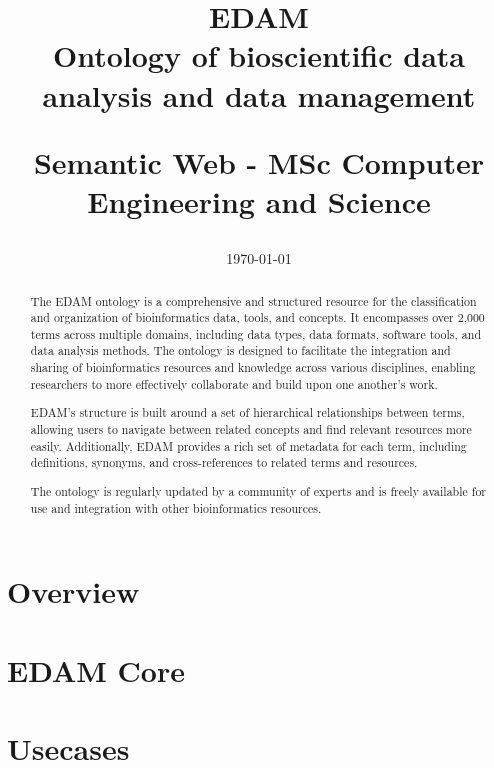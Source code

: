 \documentclass{scrartcl}
\title{EDAM
\\
Ontology of bioscientific data analysis and data management
\\
\begin{small} 
  Semantic Web - 
  MSc Computer Engineering and Science
\end{small}
}
\author{
    \emailaddr{davide.domini@studio.unibo.it}
}
\date{\today}
\begin{document}
\maketitle

\begin{abstract}
  The EDAM ontology is a comprehensive and structured resource for the classification and organization of bioinformatics data, 
    tools, and concepts. It encompasses over 2,000 terms across multiple domains, including data types, data formats, software tools, 
    and data analysis methods. The ontology is designed to facilitate the integration and sharing of bioinformatics resources and knowledge 
    across various disciplines, enabling researchers to more effectively collaborate and build upon one another's work.

  EDAM's structure is built around a set of hierarchical relationships between terms, allowing users to navigate between related concepts 
    and find relevant resources more easily. Additionally, EDAM provides a rich set of metadata for each term, including definitions, synonyms,
    and cross-references to related terms and resources.
  
  The ontology is regularly updated by a community of experts and is freely available for use and integration with other bioinformatics 
    resources. 
\end{abstract}


\newpage
\tableofcontents

\newpage
\listoffigures

\newpage

\section{Overview}

\section{EDAM Core}

\section{Usecases}


\newpage
{}
\printbibliography %
\end{document}

